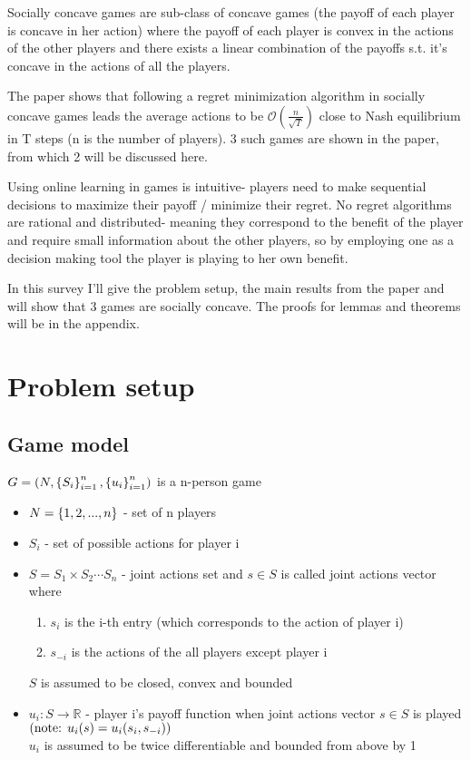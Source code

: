 \documentclass[11pt]{article}
\theoremstyle{definition}
\theoremstyle{definition}
\begin{document}
Socially concave games are sub-class of concave games (the payoff of each player is concave in her action) where the payoff of each player is convex in the actions of the other players and there exists a linear combination of the payoffs s.t. it's concave in the actions of all the players. 

The paper \cite{conv} shows that following a regret minimization algorithm in socially concave games leads the average actions to be $\mathcal{O}(\frac{n}{\sqrt{T}})$ close to Nash equilibrium in T steps (n is the number of players). 3 such games are shown in the paper, from which 2 will be discussed here.

Using online learning in games is intuitive- players need to make sequential decisions to maximize their payoff / minimize their regret. No regret algorithms are rational and distributed- meaning they correspond to the benefit of the player and require small information about the other players, so by employing one as a decision making tool the player is playing to her own benefit.

In this survey I'll give the problem setup, the main results from the paper and will show that 3 games are socially concave. The proofs for lemmas and theorems will be in the appendix.


\section{Problem setup}

\subsection{Game model}

$G = \left( N, \left\{ S_i \right\}_{i=1}^{n}, \left\{ u_i \right\}_{i=1}^{n} \right)$ is a n-person game

\begin{itemize}
	\item
		$N = \left\{ 1,2,...,n \right\}$ - set of n players
	\item
		$S_i$ - set of possible actions for player i
	\item
		$S = S_1 \times S_2 \cdots S_n$ - joint actions set and $s \in S$ is called joint actions vector where
		\begin{enumerate}
			\item
				$s_i$ is the i-th entry (which corresponds to the action of player i)
			\item
				$s_{-i}$ is the actions of the all players except player i
		\end{enumerate}
		$S$ is assumed to be closed, convex and bounded
	\item
		$u_i : S \rightarrow \mathbb{R}$ - player i's payoff function when joint actions vector $s \in S$ is played\\
		$\left( \text{note: $u_i(s) = u_i(s_i,s_{-i})$} \right)$\\
		$u_i$ is assumed to be twice differentiable and bounded from above by 1
\end{itemize}
\end{document}

